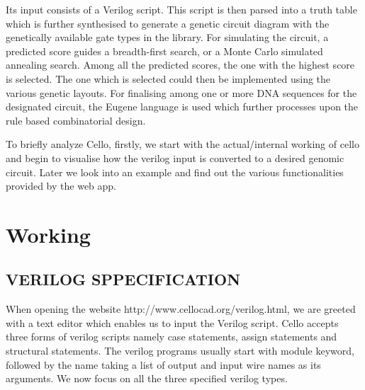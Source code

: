 \documentclass[11pt]{article}
\begin{document}
Its input consists of a Verilog script. This script is then parsed into a truth table which is further synthesised to generate a genetic circuit diagram with the genetically available gate types in the library. For simulating the circuit, a predicted score guides a breadth-first search, or a Monte Carlo simulated annealing search. Among all the predicted scores, the one with the highest score is selected. The one which is selected could then be implemented using the various genetic layouts. For finalising among one or more DNA sequences for the designated circuit, the Eugene language is used which further processes upon the rule based combinatorial design.

To briefly analyze Cello, firstly, we start with the actual/internal working of cello and begin to visualise how the verilog input is converted to a desired genomic circuit. Later we look into an example and find out the various functionalities provided by the web app.

\section*{Working}
\bigskip
\subsection*{VERILOG SPPECIFICATION}
When opening the website http://www.cellocad.org/verilog.html, we are greeted with a text editor which enables us to input the Verilog script. Cello accepts three forms of verilog scripts namely case statements, assign statements and structural statements. The verilog programs usually start with module keyword, followed by the name taking a list of output and input wire names as its arguments. We now focus on all the three specified verilog types.
\end{document}
